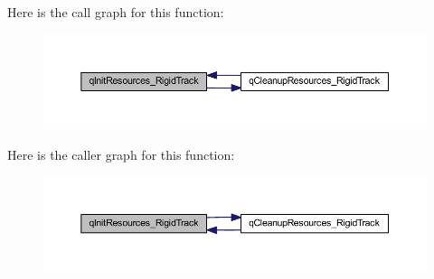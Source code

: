 Here is the call graph for this function\+:\nopagebreak
\begin{figure}[H]
\begin{center}
\leavevmode
\includegraphics[width=350pt]{qrc___rigid_track_8cpp_a656c2fbf750a7410f65e97f1dba0ac91_cgraph}
\end{center}
\end{figure}
Here is the caller graph for this function\+:\nopagebreak
\begin{figure}[H]
\begin{center}
\leavevmode
\includegraphics[width=350pt]{qrc___rigid_track_8cpp_a656c2fbf750a7410f65e97f1dba0ac91_icgraph}
\end{center}
\end{figure}
